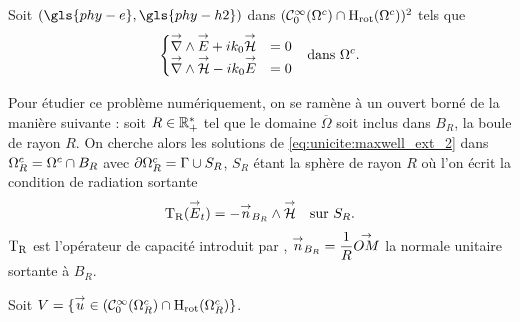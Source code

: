   Soit \((\gls{phy-e},\gls{phy-h2})\) dans \((\mathcal{C}_0^\infty(\Omega^c)\cap\mathrm{H}_\mathrm{rot}(\Omega^c))^2\) tels que
  \begin{align}
  \left\lbrace
    \begin{matrix}
      {\overset{\rightarrow}{\nabla}}\wedge {\overset{\rightarrow}{E}} + i k_0 {\overset{\rightarrow}{\mathcal{H}}} &= 0
      \\
      {\overset{\rightarrow}{\nabla}}\wedge {\overset{\rightarrow}{\mathcal{H}}} - i k_0 {\overset{\rightarrow}{E}} &= 0
    \end{matrix}
    \right. && \text{dans \(\Omega^c\).}
    \label{eq:unicite:maxwell_ext_2}
  \end{align}


  Pour étudier ce problème numériquement, on se ramène à un ouvert borné de la manière suivante : soit \(R\in\mathbb R_+^*\) tel que le domaine \(\overline{\Omega}\) soit inclus dans \(B_R\), la boule de rayon \(R\).
  On cherche alors les solutions de \eqref{eq:unicite:maxwell_ext_2} dans \(\Omega^c_R=\Omega^c\cap B_R\) avec \(\partial\Omega^c_R = \Gamma\cup S_R\), \(S_R\) étant la sphère de rayon \(R\) où l'on écrit la condition de radiation sortante
  \begin{equation}
    \label{eq:unicite:TR}
    \begin{aligned}
      \operatorname{T_R}({\overset{\rightarrow}{E}}_t) = - {\overset{\rightarrow}{n}}_{B_R} \wedge {\overset{\rightarrow}{\mathcal{H}}} && \text{sur \(S_R\).}
    \end{aligned}
  \end{equation}
  \(\operatorname{T_R}\) est l'opérateur de capacité introduit par \cite[p.~200]{nedelec_acoustic_2001}, \({\overset{\rightarrow}{n}}_{B_R}=\dfrac{1}{R}{\overset{\rightarrow}{OM}}\) la normale unitaire sortante à \(B_R\).

  Soit \(V = \lbrace {\overset{\rightarrow}{u}} \in (\mathcal{C}_0^\infty(\Omega^c_R)\cap\mathrm{H}_\mathrm{rot}(\Omega^c_R) \rbrace\).

